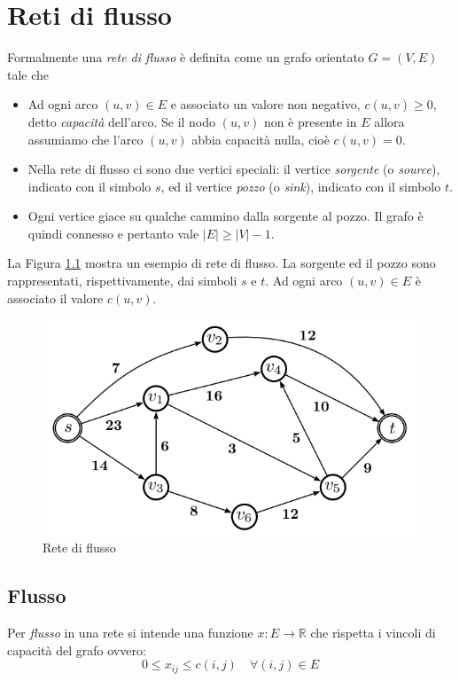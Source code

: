\chapter{Reti di flusso}\label{app:flownet}

    Formalmente una \textit{rete di flusso} è definita come un grafo orientato $G = (V, E)$ tale che
    \begin{itemize}
        \item Ad ogni arco $(u,v) \in E$ e associato un valore non negativo, $c(u, v) \ge 0$, detto \textit{capacità} dell'arco. Se il nodo $(u, v)$ non è presente in $E$ allora assumiamo che l’arco $(u, v)$ abbia capacità nulla, cioè $c(u, v) = 0$.
        \item Nella rete di flusso ci sono due vertici speciali: il vertice \textit{sorgente} (o \textit{source}), indicato con il simbolo $s$, ed il vertice \textit{pozzo} (o \textit{sink}), indicato con il simbolo $t$.
        \item Ogni vertice giace su qualche cammino dalla sorgente al pozzo. Il grafo è quindi connesso e pertanto vale $|E| \ge |V | - 1$.
    \end{itemize}

    La Figura \ref{fig:flownet} mostra un esempio di rete di flusso. La sorgente ed il pozzo sono rappresentati, rispettivamente, dai simboli $s$ e $t$. Ad ogni arco $(u, v) \in E$ è associato il valore $c(u, v)$.
    
    \begin{figure}[h]
        \centering
        \includegraphics[width=0.6\linewidth]{images/flownet.png}
        \caption{Rete di flusso}
        \label{fig:flownet}
    \end{figure}


    \section{Flusso}

        Per \textit{flusso} in una rete si intende una funzione $x : E \rightarrow \mathbb{R}$ che rispetta i vincoli di capacità del grafo ovvero:
        \begin{equation}
            0 \le x_{ij} \le c(i,j) \quad \forall (i,j) \in E
        \end{equation}

